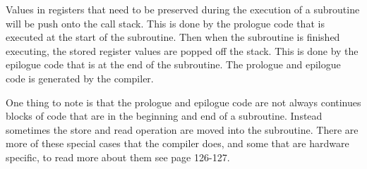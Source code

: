  


Values in registers that need to be preserved during the execution of a subroutine will be push onto the call stack.
This is done by the prologue code that is executed at the start of the subroutine.
Then when the subroutine is finished executing, the stored register values are popped off the stack.
This is done by the epilogue code that is at the end of the subroutine.
The prologue and epilogue code is generated by the compiler.


One thing to note is that the prologue and epilogue code are not always continues blocks of code that are in the beginning and end of a subroutine.
Instead sometimes the store and read operation are moved into the subroutine.
There are more of these special cases that the compiler does, and some that are hardware specific, to read more about them see \cite{dwarf} page 126-127.

